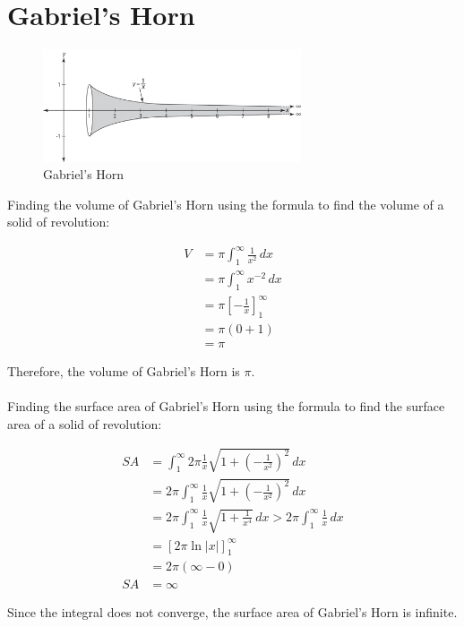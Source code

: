 \chapter{Gabriel's Horn}

\begin{figure}[h]
    \centering
    \includegraphics[width=3in]{assets/grabirels-horn.jpg}
    \caption{Gabriel's Horn}
\end{figure}

\noindent Finding the volume of Gabriel's Horn using the formula to find the volume of a solid of revolution:

\begin{align*}
V &= \pi \int_{1}^{\infty} \frac{1}{x^2} \, dx \\
  &= \pi \int_{1}^{\infty} x^{-2} \, dx \\
  &= \pi \left[-\frac{1}{x}\right]_{1}^{\infty} \\
  &= \pi \left(0 + 1\right) \\
  &= \pi
\end{align*}

\noindent Therefore, the volume of Gabriel's Horn is $\pi$.\\
\\Finding the surface area of Gabriel's Horn using the formula to find the surface area of a solid of revolution:

\begin{align*}
SA &= \int_{1}^{\infty} 2\pi \frac{1}{x} \sqrt{1+\left(-\frac{1}{x^2}\right)^2} \, dx \\
   &= 2\pi \int_{1}^{\infty} \frac{1}{x} \sqrt{1+\left(-\frac{1}{x^2}\right)^2} \, dx \\
   &= 2\pi \int_{1}^{\infty} \frac{1}{x} \sqrt{1+\frac{1}{x^4}} \, dx > 2\pi \int_{1}^{\infty} \frac{1}{x} \, dx \\ 
  &= \left[2\pi \ln |x|\right]_{1}^{\infty} \\
  &= 2\pi (\infty - 0) \\
SA &= \infty
\end{align*}

\noindent Since the integral does not converge, the surface area of Gabriel's Horn is infinite.
